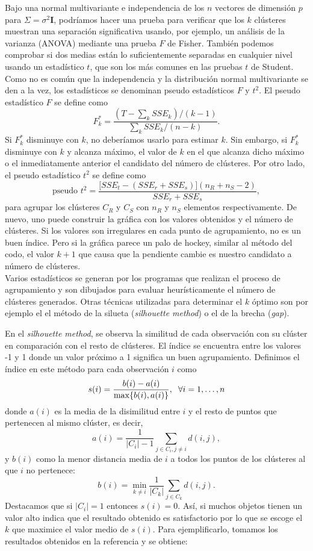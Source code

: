 \documentclass[a4paper, 20pt]{article}
\begin{document}
Bajo una normal multivariante e independencia de los $ n $ vectores de dimensión $ p $ para $ \Sigma = \sigma^2 \textbf{I} $, podríamos hacer una prueba para verificar que los $ k $ clústeres muestran una separación significativa usando, por ejemplo, un análisis de la varianza (ANOVA) mediante una prueba $ F $ de Fisher. También podemos comprobar si dos medias están lo suficientemente separadas en cualquier nivel usando un estadístico $ t $, que son los más comunes en las pruebas $ t $ de Student. Como no es común que la independencia y la distribución normal multivariante se den a la vez, los estadísticos se denominan pseudo estadísticos $ F $ y  $ t^2 $. El pseudo estadístico $ F $ se define como
\[
F^*_k = \frac{(T-\sum_k SSE_k) / (k-1)}{\sum_k SSE_k / (n-k)}.
\]
Si $ F^*_k $ disminuye con $ k $, no deberíamos usarlo para estimar $ k $. Sin embargo, si $ F^*_k $ disminuye con $ k $ y alcanza máximo, el valor de $ k $ en el que alcanza dicho máximo o el inmediatamente anterior el candidato del número de clústeres. Por otro lado, el pseudo estadístico $ t^2 $ se define como
\[
\text{pseudo }t^2 = \frac{\lbrack SSE_t - (SSE_r + SSE_s)\rbrack(n_R + n_S - 2)}{SSE_r + SSE_s},
\]
para agrupar los clústeres $ C_R $ y $ C_S $ con $ n_R $ y $ n_S $ elementos respectivamente. De nuevo, uno puede construir la gráfica con los valores obtenidos y el número de clústeres. Si los valores son irregulares en cada punto de agrupamiento, no es un buen índice. Pero si la gráfica parece un palo de hockey, similar al método del codo, el valor $ k +1 $ que causa que la pendiente cambie es nuestro candidato a número de clústeres. \\

Varios estadísticos se generan por los programas que realizan el proceso de agrupamiento y son dibujados para evaluar heurísticamente el número de clústeres generados. Otras técnicas utilizadas para determinar el $ k $ óptimo son por ejemplo el el método de la silueta (\textit{silhouette method}) o el de la brecha (\textit{gap}).

En el \textit{silhouette method}, se observa la similitud de cada observación con su clúster en comparación con el resto de clústeres. El índice se encuentra entre los valores -1 y 1 donde un valor próximo a 1 significa un buen agrupamiento. Definimos el índice en este método para cada observación $ i $ como
\[
s(i) = \frac{b(i)-a(i)}{\max\{b(i), a(i)\}}, \hspace{2mm} \forall i = 1, \dots, n
\] 
donde $ a(i) $ es la media de la disimilitud entre $ i $ y el resto de puntos que pertenecen al mismo clúster, es decir,
\[
a(i) = \frac{1}{|C_i|-1}\sum_{j\in C_i, j \neq i} d(i,j),
\]
y $ b(i) $ como la menor distancia media de $ i $ a todos los puntos de los clústeres al que $ i $ no pertenece:
\[
b(i) = \min_{k \neq i} \frac{1}{|C_k|} \sum_{j \in C_k} d(i,j).
\] 
Destacamos que si $ |C_i| = 1 $ entonces $ s(i) = 0 $. Así, si muchos objetos tienen un valor alto indica que el resultado obtenido es satisfactorio por lo que se escoge el $ k $ que maximice el valor medio de $ s(i) $. Para ejemplificarlo, tomamos los resultados obtenidos en la referencia \cite{silouetteGraph} y se obtiene:
\end{document}
